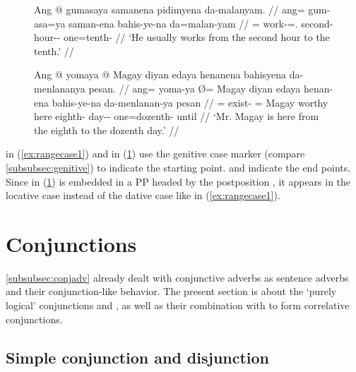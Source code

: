 \begin{figure}[h]
\pex\label{ex:rangecase}
\a\label{ex:rangecase1}\begingl
	\gla Ang @ gumasaya samanena pidimyena da-malanyam. //
	\glb ang= gum-asa=ya saman-ena bahis-ye-na da=malan-yam //
	\glc \AgtT{}= work-\Hab{}=\TsgM{}.\Top{} second-\Gen{} hour-\Pl{}-\Gen{} 
		one=tenth-\Dat{} //
	\glft `He usually works from the second hour to the tenth.' //
\endgl

\a\label{ex:rangecase2}\begingl
	\gla Ang @ yomaya {} @ Magay diyan edaya henanena bahisyena da-menlananya 
		pesan. //
	\glb ang= yoma-ya Ø= Magay diyan edaya henan-ena bahis-ye-na 
		da-menlanan-ya pesan //
	\glc \AgtT{}= exist-\TsgM{} \Top{}= Magay worthy here eighth-\Gen{} 
		day-\Pl{}-\Gen{} one=dozenth-\Loc{} until //
	\glft `Mr. Magay is here from the eighth to the dozenth day.' //
\endgl
\xe
\end{figure}

 in (\ref{ex:rangecase1}) and
 in (\ref{ex:rangecase2}) use the
genitive case marker  (compare \autoref{subsubsec:genitive}) to
indicate the starting point.  and
 indicate 
the end points. Since  in (\ref{ex:rangecase2}) is 
embedded in a PP headed by the postposition , it appears in 
the locative case instead of the dative case like  in 
(\ref{ex:rangecase1}).



\section{Conjunctions}
\label{sec:conjunctions}

\autoref{subsubsec:conjadv} already dealt with conjunctive adverbs as sentence
adverbs and their conjunction-like behavior. The present section is about the
`purely logical' conjunctions  and
, as well as their combination with 
 to form correlative conjunctions.

\subsection{Simple conjunction and disjunction}

